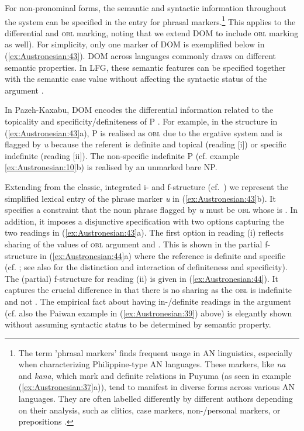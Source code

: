 \documentclass[output=paper,chinesefont]{../langscibook}
\begin{document}
For non-pronominal forms, the semantic and syntactic information throughout the system can be specified in the entry for phrasal markers.\footnote{The term 'phrasal markers' finds frequent usage in AN linguistics, especially when characterizing Philippine-type AN languages. These markers, like \emph{na} and \emph{kana}, which mark \SUBJ and definite \OBL relations in Puyuma (as seen in example (\ref{ex:Austronesian:37}a)), tend to manifest in diverse forms across various AN languages. They are often labelled differently by different authors depending on their analysis, such as clitics, case markers, non-/personal markers, or prepositions \citep[144--149]{Himmelmann2005}.} This applies to the differential \OBJ and \textsc{obl} marking, noting that we extend DOM to include \textsc{obl} marking as well). For simplicity, only one marker of DOM is exemplified below in (\ref{ex:Austronesian:43}). DOM across languages commonly draws on different semantic properties. In LFG, these semantic features can be specified together with the semantic case value without affecting the syntactic status of the argument \citep{buttking91,buttking03-case,DN}.

In Pazeh-Kaxabu, DOM encodes the differential information related to the topicality and specificity/definiteness of P \citep{Yeh:PhD}. For example, in the \AV structure in (\ref{ex:Austronesian:43}a), P is realised as \textsc{obl} due to the ergative system and is flagged by \emph{u} because the referent is definite and topical (reading [i]) or specific indefinite (reading [ii]). The non-specific indefinite P (cf. example \ref{ex:Austronesian:10}b) is realised by an unmarked bare NP.

Extending from the classic, integrated i- and f-structure (cf.\ \citealt{BM87}) we represent the simplified lexical entry of the phrase marker \emph{u} in (\ref{ex:Austronesian:43}b). It specifies a constraint that the noun phrase flagged by \emph{u} must be \textsc{obl} whose \CASE is \LOC. In addition, it imposes a disjunctive specification with two options capturing the two readings in (\ref{ex:Austronesian:43}a). The first option in reading (i) reflects sharing of the values of \textsc{obl} argument and \TOPIC. This is shown in the partial f-structure in (\ref{ex:Austronesian:44}a) where the reference is definite and specific (cf. \citealt{enc1991}; see also \citealt{Heusinger2002} for the distinction and interaction of definiteness and specificity). The (partial) f-structure for reading (ii) is given in (\ref{ex:Austronesian:44}). It captures the crucial difference in that there is no sharing as the \textsc{obl} is indefinite and not \TOPIC. The empirical fact about having in-/definite readings in the \OBL argument (cf. also the Paiwan example in (\ref{ex:Austronesian:39}) above) is elegantly shown without assuming syntactic status to be determined by semantic property.
\end{document}
